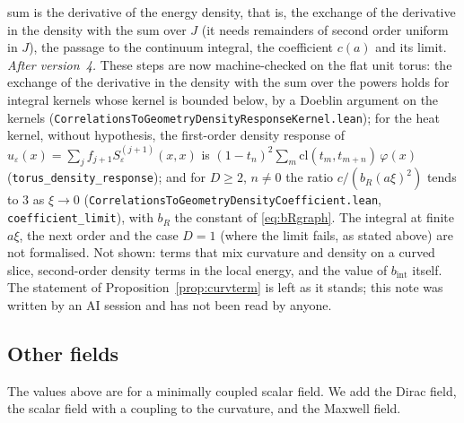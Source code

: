\documentclass[11pt,a4paper]{article}
\theoremstyle{stmt}
\theoremstyle{defn}
\theoremstyle{rmk}
\numberwithin{equation}{section}
\begin{document}
sum is the derivative of the energy density, that is, the exchange of the derivative in the density with the sum over $J$ (it needs remainders of second order uniform in $J$), the passage to the continuum integral, the coefficient $c(a)$ and its limit. \emph{After version~4.} These steps are now machine-checked on the flat unit torus: the exchange of the derivative in the density with the sum over the powers holds for integral kernels whose kernel is bounded below, by a Doeblin argument on the kernels (\texttt{CorrelationsToGeometryDensityResponseKernel.lean}); for the heat kernel, without hypothesis, the first-order density response of $u_\varepsilon(x)=\sum_jf_{j+1}S_\varepsilon^{(j+1)}(x,x)$ is $(1-t_n)^2\sum_m\mathrm{cl}(t_m,t_{m+n})\,\varphi(x)$ (\texttt{torus\_density\_response}); and for $D\ge2$, $n\ne0$ the ratio $c/(b_R(a\xi)^2)$ tends to $3$ as $\xi\to0$ (\texttt{CorrelationsToGeometryDensityCoefficient.lean}, \texttt{coefficient\_limit}), with $b_R$ the constant of \eqref{eq:bRgraph}. The integral at finite $a\xi$, the next order and the case $D=1$ (where the limit fails, as stated above) are not formalised. Not shown: terms that mix curvature and density on a curved slice, second-order density terms in the local energy, and the value of $b_{\mathrm{int}}$ itself. The statement of Proposition~\ref{prop:curvterm} is left as it stands; this note was written by an AI session and has not been read by anyone.

\subsection{Other fields}\label{sec:fields}

The values above are for a minimally coupled scalar field. We add the Dirac field, the scalar field with a coupling to the curvature, and the Maxwell field.
\end{document}
